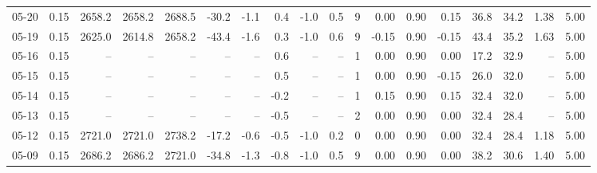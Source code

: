 \begin{threeparttable}
{\begin{tabular}{lrrrrrrrrrrrrrrrrr}
  05-20 &     0.15 & 2658.2 & 2658.2 & 2688.5 &      -30.2 &           -1.1 &                       0.4 &                     -1.0 &                 0.5 &              9 &       0.00 &      0.90 &           0.15 &             36.8 &                34.2 &            1.38 &                   5.00 \\
  05-19 &     0.15 & 2625.0 & 2614.8 & 2658.2 &      -43.4 &           -1.6 &                       0.3 &                     -1.0 &                 0.6 &              9 &      -0.15 &      0.90 &          -0.15 &             43.4 &                35.2 &            1.63 &                   5.00 \\
  05-16 &     0.15 &     -- &     -- &     -- &         -- &             -- &                       0.6 &                       -- &                  -- &              1 &       0.00 &      0.90 &           0.00 &             17.2 &                32.9 &              -- &                   5.00 \\
  05-15 &     0.15 &     -- &     -- &     -- &         -- &             -- &                       0.5 &                       -- &                  -- &              1 &       0.00 &      0.90 &          -0.15 &             26.0 &                32.0 &              -- &                   5.00 \\
  05-14 &     0.15 &     -- &     -- &     -- &         -- &             -- &                      -0.2 &                       -- &                  -- &              1 &       0.15 &      0.90 &           0.15 &             32.4 &                32.0 &              -- &                   5.00 \\
  05-13 &     0.15 &     -- &     -- &     -- &         -- &             -- &                      -0.5 &                       -- &                  -- &              2 &       0.00 &      0.90 &           0.00 &             32.4 &                28.4 &              -- &                   5.00 \\
  05-12 &     0.15 & 2721.0 & 2721.0 & 2738.2 &      -17.2 &           -0.6 &                      -0.5 &                     -1.0 &                 0.2 &              0 &       0.00 &      0.90 &           0.00 &             32.4 &                28.4 &            1.18 &                   5.00 \\
  05-09 &     0.15 & 2686.2 & 2686.2 & 2721.0 &      -34.8 &           -1.3 &                      -0.8 &                     -1.0 &                 0.5 &              9 &       0.00 &      0.90 &           0.00 &             38.2 &                30.6 &            1.40 &                   5.00 \\

\end{tabular}}
\end{threeparttable}
